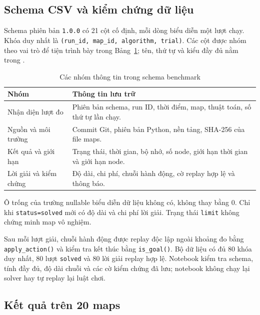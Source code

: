 \subsection{Schema CSV và kiểm chứng dữ liệu}

Schema phiên bản \texttt{1.0.0} có 21 cột cố định, mỗi dòng biểu diễn một
lượt chạy. Khóa duy nhất là
\texttt{(run\_id, map\_id, algorithm, trial)}. Các cột được nhóm theo
vai trò để tiện trình bày trong Bảng~\ref{tab:csv_groups}; tên, thứ tự
và kiểu đầy đủ nằm trong .

\begin{table}[htbp]
    \centering
    \caption{Các nhóm thông tin trong schema benchmark}
    \label{tab:csv_groups}
    \small
    \begin{tabularx}{\textwidth}{@{}p{3.3cm}X@{}}
        \toprule
        \textbf{Nhóm} & \textbf{Thông tin lưu trữ} \\
        \midrule
        Nhận diện lượt đo & Phiên bản schema, run ID, thời điểm, map,
        thuật toán, số thứ tự lần chạy. \\
        Nguồn và môi trường & Commit Git, phiên bản Python, nền tảng,
        SHA-256 của file maps. \\
        Kết quả và giới hạn & Trạng thái, thời gian, bộ nhớ, số node,
        giới hạn thời gian và giới hạn node. \\
        Lời giải và kiểm chứng & Độ dài, chi phí, chuỗi hành động,
        cờ replay hợp lệ và thông báo. \\
        \bottomrule
    \end{tabularx}
\end{table}

Ô trống của trường nullable biểu diễn dữ liệu không có, không thay bằng
0. Chỉ khi \texttt{status=solved} mới có độ dài và chi phí lời giải.
Trạng thái \texttt{limit} không chứng minh map vô nghiệm.

Sau mỗi lượt giải, chuỗi hành động được replay độc lập ngoài khoảng đo
bằng \texttt{apply\_action()} và kiểm tra kết thúc bằng
\texttt{is\_goal()}. Bộ dữ liệu có đủ 80 khóa duy nhất, 80 lượt
\texttt{solved} và 80 lời giải replay hợp lệ. Notebook kiểm tra schema,
tính đầy đủ, độ dài chuỗi và các cờ kiểm chứng đã lưu; notebook không
chạy lại solver hay tự replay lại luật chơi.

\subsection{Kết quả trên 20 maps}

